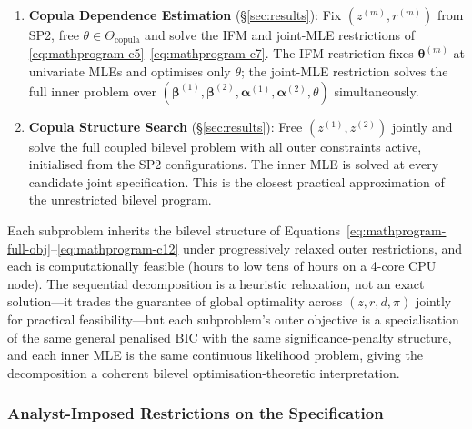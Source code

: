 \documentclass[letterpaper,8pt]{extarticle}  %
\begin{document}
\begin{doublespacing}
\begin{linenumbers}
\begin{enumerate}[label=\textbf{SP\arabic*.}, leftmargin=*]
  \item \textbf{Copula Dependence Estimation} (\S\ref{sec:results}): Fix $(z^{(m)}, r^{(m)})$ from SP2, free $\theta \in \Theta_{\text{copula}}$ and solve the IFM and joint-MLE restrictions of \eqref{eq:mathprogram-c5}--\eqref{eq:mathprogram-c7}. The IFM restriction fixes $\boldsymbol\theta^{(m)}$ at univariate MLEs and optimises only $\theta$; the joint-MLE restriction solves the full inner problem over $(\boldsymbol\beta^{(1)}, \boldsymbol\beta^{(2)}, \boldsymbol\alpha^{(1)}, \boldsymbol\alpha^{(2)}, \theta)$ simultaneously.

  \item \textbf{Copula Structure Search} (\S\ref{sec:results}): Free $(z^{(1)}, z^{(2)})$ jointly and solve the full coupled bilevel problem with all outer constraints active, initialised from the SP2 configurations. The inner MLE is solved at every candidate joint specification. This is the closest practical approximation of the unrestricted bilevel program.
\end{enumerate}

Each subproblem inherits the bilevel structure of Equations~\eqref{eq:mathprogram-full-obj}--\eqref{eq:mathprogram-c12} under progressively relaxed outer restrictions, and each is computationally feasible (hours to low tens of hours on a 4-core CPU node). The sequential decomposition is a heuristic relaxation, not an exact solution---it trades the guarantee of global optimality across $(z,r,d,\pi)$ jointly for practical feasibility---but each subproblem's outer objective is a specialisation of the same general penalised BIC with the same significance-penalty structure, and each inner MLE is the same continuous likelihood problem, giving the decomposition a coherent bilevel optimisation-theoretic interpretation.

\subsubsection*{Analyst-Imposed Restrictions on the Specification}


\end{linenumbers}
\end{doublespacing}
\end{document}
